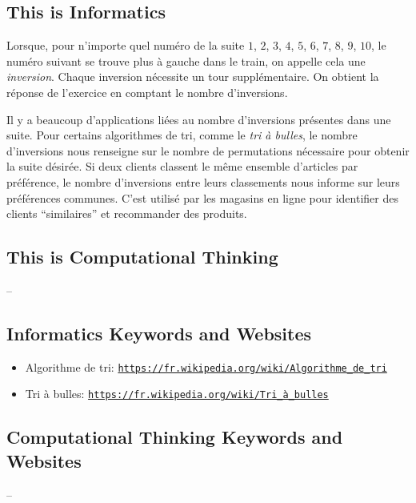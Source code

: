 \documentclass[a4paper,11pt]{report}
\newcommand{\BrochureUrlText}[1]{\texttt{#1}}
\begin{document}
\subsection*{This is Informatics}

Lorsque, pour n’importe quel numéro de la suite $1$, $2$, $3$, $4$, $5$, $6$, $7$, $8$, $9$, $10$, le numéro suivant se trouve plus à gauche dans le train, on appelle cela une \emph{inversion}. Chaque inversion nécessite un tour supplémentaire. On obtient la réponse de l’exercice en comptant le nombre d’inversions.

Il y a beaucoup d’applications liées au nombre d’inversions présentes dans une suite. Pour certains algorithmes de tri, comme le \emph{tri à bulles}, le nombre d’inversions nous renseigne sur le nombre de permutations nécessaire pour obtenir la suite désirée. Si deux clients classent le même ensemble d’articles par préférence, le nombre d’inversions entre leurs classements nous informe sur leurs préférences communes. C’est utilisé par les magasins en ligne pour identifier des clients “similaires” et recommander des produits.


\subsection*{This is Computational Thinking}

–


\subsection*{Informatics Keywords and Websites}

\begin{itemize}
  \item Algorithme de tri: \href{https://fr.wikipedia.org/wiki/Algorithme_de_tri}{\BrochureUrlText{https://fr.wikipedia.org/wiki/Algorithme\_de\_tri}}
  \item Tri à bulles: \href{https://fr.wikipedia.org/wiki/Tri_\%C3\%A0_bulles}{\BrochureUrlText{https://fr.wikipedia.org/wiki/Tri\_à\_bulles}}
\end{itemize}


\subsection*{Computational Thinking Keywords and Websites}

–
\end{document}
